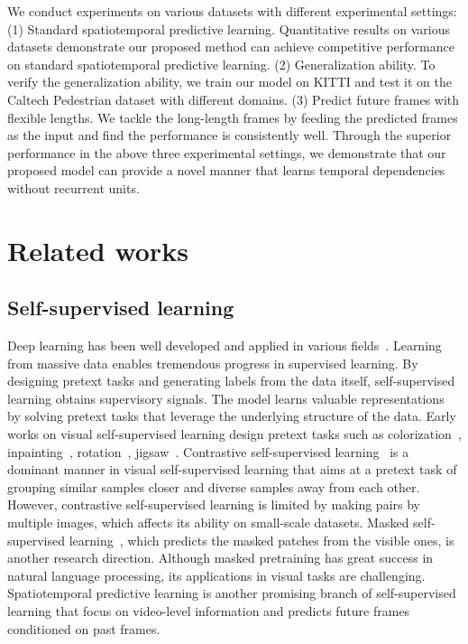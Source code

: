 \documentclass[10pt,twocolumn,letterpaper]{article}
\begin{document}
We conduct experiments on various datasets with different experimental settings: (1) Standard spatiotemporal predictive learning. Quantitative results on various datasets demonstrate our proposed method can achieve competitive performance on standard spatiotemporal predictive learning. (2) Generalization ability. To verify the generalization ability, we train our model on KITTI and test it on the Caltech Pedestrian dataset with different domains. (3) Predict future frames with flexible lengths. We tackle the long-length frames by feeding the predicted frames as the input and find the performance is consistently well. Through the superior performance in the above three experimental settings, we demonstrate that our proposed model can provide a novel manner that learns temporal dependencies without recurrent units.

\section{Related works}

\subsection{Self-supervised learning}


Deep learning has been well developed and applied in various fields~\cite{liu2022decoupled,cao2022survey,liu2022automix,zheng2022using,zheng2021enhancing}. Learning from massive data enables tremendous progress in supervised learning. By designing pretext tasks and generating labels from the data itself, self-supervised learning obtains supervisory signals. The model learns valuable representations by solving pretext tasks that leverage the underlying structure of the data. Early works on visual self-supervised learning design pretext tasks such as colorization~\cite{zhang2016colorful}, inpainting~\cite{pathak2016context}, rotation~\cite{gidaris2018unsupervised}, jigsaw~\cite{noroozi2016unsupervised}. Contrastive self-supervised learning~\cite{he2020momentum,chen2020simple,NEURIPS2020_f3ada80d,chen2020big,wang2020understanding,zbontar2021barlow} is a dominant manner in visual self-supervised learning that aims at a pretext task of grouping similar samples closer and diverse samples away from each other. However, contrastive self-supervised learning is limited by making pairs by multiple images, which affects its ability on small-scale datasets. Masked self-supervised learning~\cite{kenton2019bert,yang2019xlnet,lewis2020bart,dosovitskiy2020image,he2021masked,liu2021swin}, which predicts the masked patches from the visible ones, is another research direction. Although masked pretraining has great success in natural language processing, its applications in visual tasks are challenging. Spatiotemporal predictive learning is another promising branch of self-supervised learning that focus on video-level information and predicts future frames conditioned on past frames. 
\end{document}
